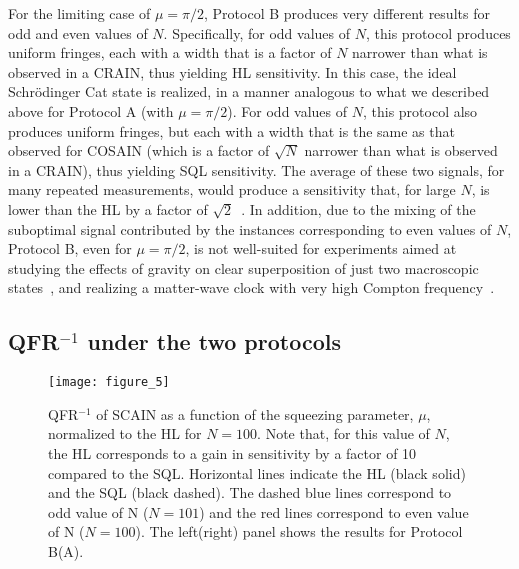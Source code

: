 \documentclass[aps,pra,letterpaper,superscriptaddress,showpacs,amsmath,floats,twocolumn]{revtex4-1}
\begin{document}
For the limiting case of $\mu = \pi/2$, Protocol B produces very different results for odd and even values of $N$. Specifically, for odd values of $N$, this protocol produces uniform fringes, each with a width that is a factor of $N$ narrower than what is observed in a CRAIN, thus yielding HL sensitivity. In this case, the ideal Schr\"odinger Cat state is realized, in a manner analogous to what we described above for Protocol A (with $\mu=\pi/2$). For odd values of $N$, this protocol also produces uniform fringes, but each with a width that is the same as that observed for COSAIN (which is a factor of $\sqrt{N}$ narrower than what is observed in a CRAIN), thus yielding SQL sensitivity. The average of these two signals, for many repeated measurements, would produce a sensitivity that, for large $N$, is lower than the HL by a factor of $\sqrt{2}$~\cite{Shahriar2}. In addition, due to the mixing of the suboptimal signal contributed by the instances corresponding to even values of $N$, Protocol B, even for $\mu=\pi/2$, is not well-suited for experiments aimed at studying the effects of gravity on clear superposition of just two macroscopic states~\cite{Diosi, Penrose1, Penrose2, Penrose3},  and realizing a matter-wave clock with very high Compton frequency~\cite{Lan}.

\subsection{QFR$^{-1}$ under the two protocols}

\begin{figure}[h]
\texttt{[image: figure\_5]}
\caption{QFR$^{-1}$ of SCAIN as a function of the squeezing parameter, $\mu$, normalized to the HL for $N = 100$. Note that, for this value of $N$, the HL corresponds to a gain in sensitivity by a factor of 10 compared to the SQL. Horizontal lines indicate the HL (black solid) and the SQL (black dashed). The dashed blue lines correspond to odd value of N ($N = 101$) and the red lines correspond to even value of N ($N = 100$). The left(right) panel shows the results for Protocol B(A).}
\label{fig:5}
\end{figure}
%
\end{document}

